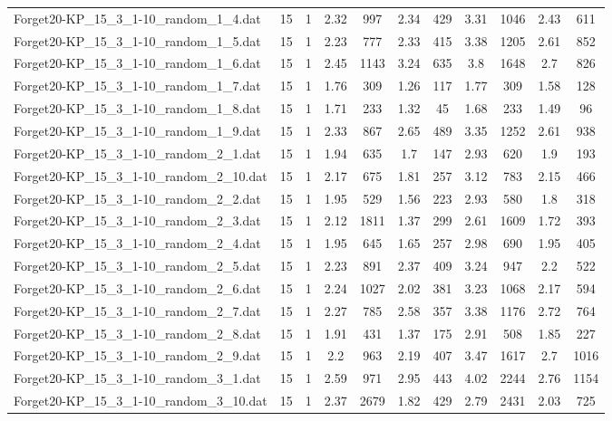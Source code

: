 \begin{table}[!ht]
\begin{tabular}{lcccccccccc}
Forget20-KP\_15\_3\_1-10\_random\_1\_4.dat & 15 & 1 & 2.32 & 997 & 2.34 & 429 & 3.31 & 1046 & 2.43 & 611 \\
Forget20-KP\_15\_3\_1-10\_random\_1\_5.dat & 15 & 1 & 2.23 & 777 & 2.33 & 415 & 3.38 & 1205 & 2.61 & 852 \\
Forget20-KP\_15\_3\_1-10\_random\_1\_6.dat & 15 & 1 & 2.45 & 1143 & 3.24 & 635 & 3.8 & 1648 & 2.7 & 826 \\
Forget20-KP\_15\_3\_1-10\_random\_1\_7.dat & 15 & 1 & 1.76 & 309 & 1.26 & 117 & 1.77 & 309 & 1.58 & 128 \\
Forget20-KP\_15\_3\_1-10\_random\_1\_8.dat & 15 & 1 & 1.71 & 233 & 1.32 & 45 & 1.68 & 233 & 1.49 & 96 \\
Forget20-KP\_15\_3\_1-10\_random\_1\_9.dat & 15 & 1 & 2.33 & 867 & 2.65 & 489 & 3.35 & 1252 & 2.61 & 938 \\
Forget20-KP\_15\_3\_1-10\_random\_2\_1.dat & 15 & 1 & 1.94 & 635 & 1.7 & 147 & 2.93 & 620 & 1.9 & 193 \\
Forget20-KP\_15\_3\_1-10\_random\_2\_10.dat & 15 & 1 & 2.17 & 675 & 1.81 & 257 & 3.12 & 783 & 2.15 & 466 \\
Forget20-KP\_15\_3\_1-10\_random\_2\_2.dat & 15 & 1 & 1.95 & 529 & 1.56 & 223 & 2.93 & 580 & 1.8 & 318 \\
Forget20-KP\_15\_3\_1-10\_random\_2\_3.dat & 15 & 1 & 2.12 & 1811 & 1.37 & 299 & 2.61 & 1609 & 1.72 & 393 \\
Forget20-KP\_15\_3\_1-10\_random\_2\_4.dat & 15 & 1 & 1.95 & 645 & 1.65 & 257 & 2.98 & 690 & 1.95 & 405 \\
Forget20-KP\_15\_3\_1-10\_random\_2\_5.dat & 15 & 1 & 2.23 & 891 & 2.37 & 409 & 3.24 & 947 & 2.2 & 522 \\
Forget20-KP\_15\_3\_1-10\_random\_2\_6.dat & 15 & 1 & 2.24 & 1027 & 2.02 & 381 & 3.23 & 1068 & 2.17 & 594 \\
Forget20-KP\_15\_3\_1-10\_random\_2\_7.dat & 15 & 1 & 2.27 & 785 & 2.58 & 357 & 3.38 & 1176 & 2.72 & 764 \\
Forget20-KP\_15\_3\_1-10\_random\_2\_8.dat & 15 & 1 & 1.91 & 431 & 1.37 & 175 & 2.91 & 508 & 1.85 & 227 \\
Forget20-KP\_15\_3\_1-10\_random\_2\_9.dat & 15 & 1 & 2.2 & 963 & 2.19 & 407 & 3.47 & 1617 & 2.7 & 1016 \\
Forget20-KP\_15\_3\_1-10\_random\_3\_1.dat & 15 & 1 & 2.59 & 971 & 2.95 & 443 & 4.02 & 2244 & 2.76 & 1154 \\
Forget20-KP\_15\_3\_1-10\_random\_3\_10.dat & 15 & 1 & 2.37 & 2679 & 1.82 & 429 & 2.79 & 2431 & 2.03 & 725 \\

\end{tabular}
\end{table}
